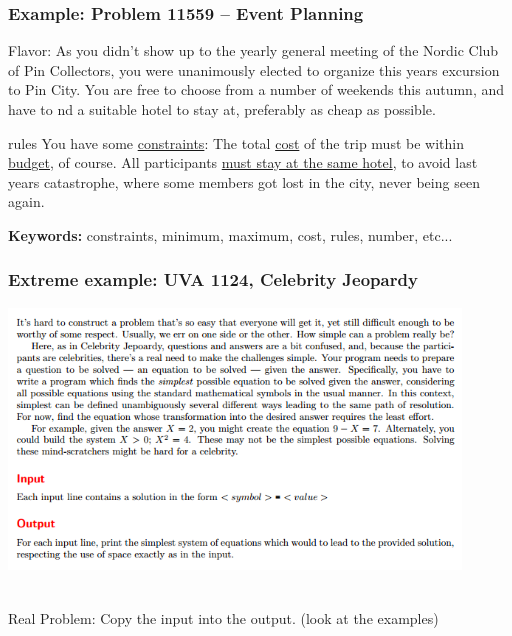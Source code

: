 \documentclass{beamer}
\begin{document}
\begin{frame}
  \frametitle{Example: Problem 11559 -- Event Planning}

  {\smaller
  \begin{alertblock}{Flavor:}
    As you didn't show up to the yearly general meeting of the Nordic
    Club of Pin Collectors, you were unanimously elected to organize
    this years excursion to Pin City.  You are free to choose from a
    number of weekends this autumn, and have to  nd a suitable hotel
    to stay at, preferably as cheap as possible.
  \end{alertblock}

  \begin{exampleblock}{rules}
    You have some \underline{constraints}: The total \underline{cost}
    of the trip must be within \underline{budget}, of course. All
    participants \underline{must stay at the same hotel}, to avoid
    last years catastrophe, where some members got lost in the city,
    never being seen again.
  \end{exampleblock}

  \bigskip

  {\bf Keywords:} constraints, minimum, maximum, cost, rules, number,
  etc...  }
\end{frame}


\begin{frame}
  \frametitle{Extreme example: UVA 1124, Celebrity Jeopardy}
  \includegraphics[width=0.9\textwidth]{../img/celebrityjeopardy}

  \hrulefill\\
  \alert{Real Problem:}
  Copy the input into the output. (look at the examples)
\end{frame}
\end{document}
